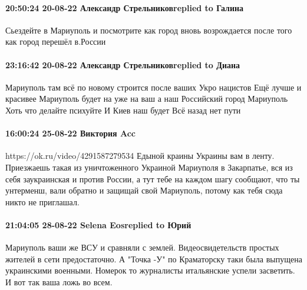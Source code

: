 \paragraph{20:50:24 20-08-22 Александр Стрельниковreplied to Галина}

Сьездейте в Мариуполь и посмотрите как город вновь возрождается после того как
город перешёл в.России

\paragraph{23:16:42 20-08-22 Александр Стрельниковreplied to Диана}

Мариуполь там всё по новому строится после ваших Укро нацистов Ещё лучше и
красивее Мариуполь будет на уже на ваш а наш Российский город Мариуполь Хоть
что делайте психуйте И Киев наш будет Всё назад нет пути

\paragraph{16:00:24 25-08-22 Виктория Acc}

https://ok.ru/video/4291587279534 Едыной краины Украины вам в ленту.
Приезжаешь такая из уничтоженного Украиной Мариуполя в Закарпатье, вся из себя заукраинская и против России, а тут тебе на каждом шагу сообщают, что ты унтерменш, вали обратно и защищай свой Мариуполь, потому как тебя сюда никто не приглашал.

\paragraph{21:04:05 28-08-22 Selena Eosreplied to Юрий}

Мариуполь ваши же ВСУ и сравняли с землей. Видеосвидетельств простых жителей в сети предостаточно. 
А "Точка -У" по Краматорску таки была выпущена украинскими военными. Номерок то журналисты итальянские успели засветить. И вот так ваша ложь во всем.

